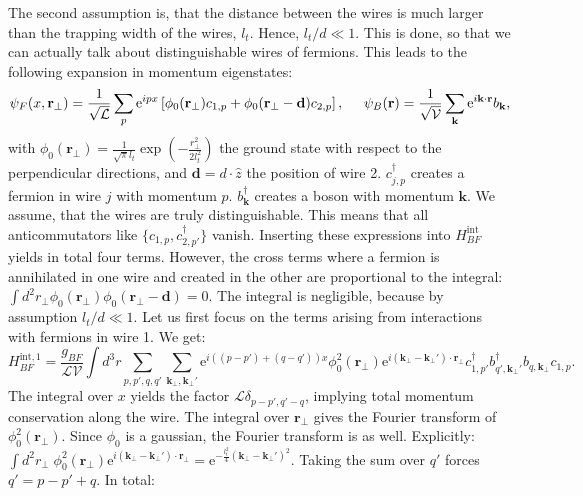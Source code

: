 The second assumption is, that the distance between the wires is much larger than the trapping width of the wires, $l_t$. Hence, $l_t/d \ll 1$. This is done, so that we can actually talk about distinguishable wires of fermions. This leads to the following expansion in momentum eigenstates:
\begin{equation}
\psi_F(x,\mathbf{r}_\perp) = \frac{1}{\sqrt{\mathcal{L}}}\sum_p \text{e}^{ipx} \left[\phi_0(\mathbf{r}_\perp) c_{1,p} + \phi_0(\mathbf{r}_\perp - \mathbf{d}) c_{2,p}\right], \hspace{0.5cm} \psi_B(\mathbf{r}) = \frac{1}{\sqrt{\mathcal{V}}}\sum_{\mathbf{k}} \text{e}^{i\mathbf{k}\cdot \mathbf{r}} b_\mathbf{k}, 
\end{equation}  
with $\phi_0(\mathbf{r}_\perp) = \frac{1}{\sqrt{\pi}l_t}\exp\left(-\frac{r_\perp^2}{2l_t^2}\right)$ the ground state with respect to the perpendicular directions, and $\mathbf{d} = d\cdot\hat{z}$ the position of wire 2. $c^\dagger_{j,p}$ creates a fermion in wire $j$ with momentum $p$. $b^\dagger_\mathbf{k}$ creates a boson with momentum $\mathbf{k}$.  We assume, that the wires are truly distinguishable. This means that all anticommutators like $\{c_{1,p}, c^\dagger_{2,p'}\}$ vanish. Inserting these expressions into $H_{BF}^\text{int}$ yields in total four terms. However, the cross terms where a fermion is annihilated in one wire and created in the other are proportional to the integral: $\int d^2 r_\perp \phi_0(\mathbf{r}_\perp)\phi_0(\mathbf{r}_\perp-\mathbf{d}) = 0$. The integral is negligible, because by assumption $l_t/d \ll 1$. Let us first focus on the terms arising from interactions with fermions in wire 1. We get:
\begin{equation}
H_{BF}^{\text{int}, 1} = \frac{g_{BF}}{\mathcal{LV}}\int d^3 r \sum_{p,p',q,q'}\sum_{\mathbf{k}_{\perp},\mathbf{k}_{\perp}'}\text{e}^{i((p-p')+(q-q'))x} \phi^2_0(\mathbf{r}_{\perp})\text{e}^{i(\mathbf{k}_{\perp} - \mathbf{k}_{\perp}')\cdot \mathbf{r}_\perp} c^\dagger_{1,p'} b^\dagger_{q',\mathbf{k}_\perp'}b_{q,\mathbf{k}_\perp}c_{1,p}. \nonumber
\end{equation}
The integral over $x$ yields the factor $\mathcal{L}\delta_{p-p',q'-q}$, implying total momentum conservation along the wire. The integral over $\mathbf{r}_\perp$ gives the Fourier transform of $\phi_0^2(\mathbf{r}_\perp)$. Since $\phi_0$ is a gaussian, the Fourier transform is as well. Explicitly: $\int d^2 r_\perp \; \phi^2_0(\mathbf{r}_{\perp})\text{e}^{i(\mathbf{k}_{\perp}-\mathbf{k}_{\perp}')\cdot \mathbf{r}_\perp} = \text{e}^{-\frac{l_t^2}{4}(\mathbf{k}_{\perp}-\mathbf{k}_{\perp}')^2}$. Taking the sum over $q'$ forces $q' = p - p' + q$. In total:
